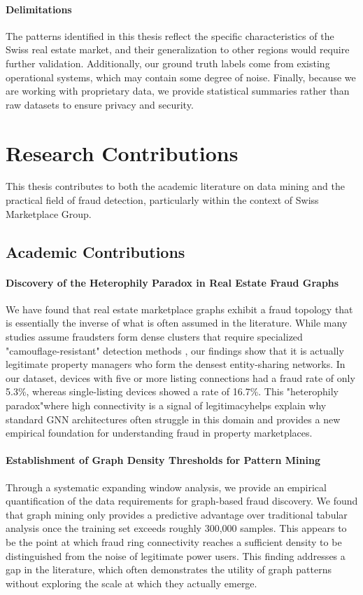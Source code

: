 \paragraph{Delimitations}
The patterns identified in this thesis reflect the specific characteristics of the Swiss real estate market, and their generalization to other regions would require further validation. Additionally, our ground truth labels come from existing operational systems, which may contain some degree of noise. Finally, because we are working with proprietary data, we provide statistical summaries rather than raw datasets to ensure privacy and security.

\section{Research Contributions}
\label{sec:1_4}

This thesis contributes to both the academic literature on data mining and the practical field of fraud detection, particularly within the context of Swiss Marketplace Group.

\subsection*{Academic Contributions}

\paragraph{Discovery of the Heterophily Paradox in Real Estate Fraud Graphs}
We have found that real estate marketplace graphs exhibit a fraud topology that is essentially the inverse of what is often assumed in the literature. While many studies assume fraudsters form dense clusters that require specialized "camouflage-resistant" detection methods \cite{dou2020enhancing,liu2020alleviating}, our findings show that it is actually legitimate property managers who form the densest entity-sharing networks. In our dataset, devices with five or more listing connections had a fraud rate of only 5.3\%, whereas single-listing devices showed a rate of 16.7\%. This "heterophily paradox"where high connectivity is a signal of legitimacyhelps explain why standard GNN architectures often struggle in this domain and provides a new empirical foundation for understanding fraud in property marketplaces.

\paragraph{Establishment of Graph Density Thresholds for Pattern Mining}
Through a systematic expanding window analysis, we provide an empirical quantification of the data requirements for graph-based fraud discovery. We found that graph mining only provides a predictive advantage over traditional tabular analysis once the training set exceeds roughly 300,000 samples. This appears to be the point at which fraud ring connectivity reaches a sufficient density to be distinguished from the noise of legitimate power users. This finding addresses a gap in the literature, which often demonstrates the utility of graph patterns without exploring the scale at which they actually emerge.

